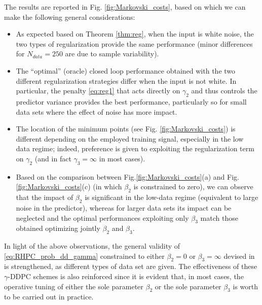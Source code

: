 \documentclass[letterpaper, 10 pt, conference]{ieeeconf}  %
\begin{document}
The results are reported  in Fig. \ref{fig:Markovski_costs}, based on which  we can make the following general considerations:
\begin{itemize}
	\item As expected based on Theorem \ref{thm:reg}, when the input is white noise, the two types of regularization provide the same performance (minor differences for $N_{data}=250$ are due to  sample variability).
	\item The ``optimal'' (oracle) closed loop performance obtained with the two different regularization strategies differ when the input is not white. In particular, the penalty \eqref{eq:reg1} that acts directly on $\gamma_2$ and thus controls the predictor variance provides the best performance, particularly so for small data sets where the effect of noise has more impact.  
	\item The location of the minimum points (see Fig. \ref{fig:Markovski_costs}) is different depending on the employed training signal, especially in the low data regime; indeed, preference is given to exploiting the regularization term on $\gamma_2$ (and in fact $\gamma_3 = \infty$ in most cases).
	\item Based on the comparison between Fig.\ref{fig:Markovski_costs}(a) and Fig. \ref{fig:Markovski_costs}(c) (in which $\beta_2$ is constrained to zero), we can observe that the impact of $\beta_2$ is significant in the low-data regime (equivalent to large noise in the predictor), whereas for larger data sets its impact can be neglected and the optimal performances exploiting only $\beta_3$ match those obtained optimizing jointly $\beta_2$ and $\beta_3$.
\end{itemize}



In light of the above observations, the general validity of \eqref{eq:RHPC_prob_dd_gamma} constrained to either $\beta_2=0$ or $\beta_3=\infty$ devised in \cite{breschi2022uncertainty} is strengthened, as different types of data set are given. The effectiveness of these $\gamma$-DDPC schemes is also reinforced since it is evident that, in most cases, the operative tuning of either the sole parameter $\beta_2$ or the sole parameter $\beta_3$ is worth to be carried out in practice.
\end{document}
